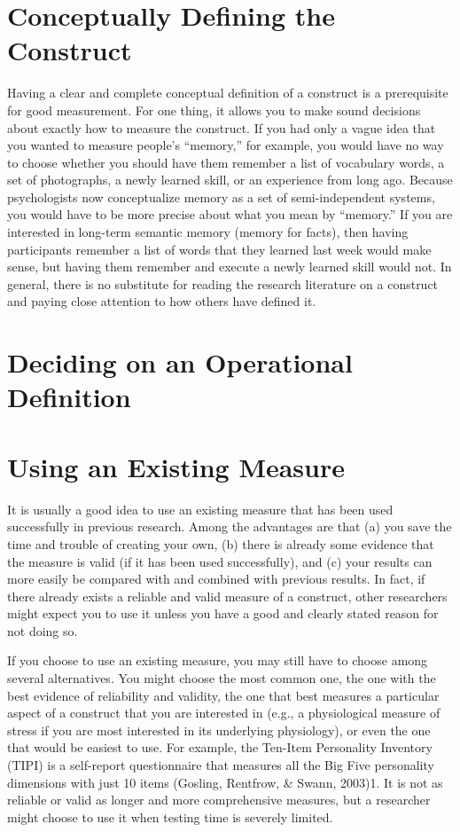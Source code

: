 \documentclass[]{book}
\theoremstyle{definition}
\theoremstyle{definition}
\theoremstyle{remark}
\begin{document}
\section{Conceptually Defining the
Construct}\label{conceptually-defining-the-construct}

Having a clear and complete conceptual definition of a construct is a
prerequisite for good measurement. For one thing, it allows you to make
sound decisions about exactly how to measure the construct. If you had
only a vague idea that you wanted to measure people's ``memory,'' for
example, you would have no way to choose whether you should have them
remember a list of vocabulary words, a set of photographs, a newly
learned skill, or an experience from long ago. Because psychologists now
conceptualize memory as a set of semi-independent systems, you would
have to be more precise about what you mean by ``memory.'' If you are
interested in long-term semantic memory (memory for facts), then having
participants remember a list of words that they learned last week would
make sense, but having them remember and execute a newly learned skill
would not. In general, there is no substitute for reading the research
literature on a construct and paying close attention to how others have
defined it.

\section{Deciding on an Operational
Definition}\label{deciding-on-an-operational-definition}

\section{Using an Existing Measure}\label{using-an-existing-measure}

It is usually a good idea to use an existing measure that has been used
successfully in previous research. Among the advantages are that (a) you
save the time and trouble of creating your own, (b) there is already
some evidence that the measure is valid (if it has been used
successfully), and (c) your results can more easily be compared with and
combined with previous results. In fact, if there already exists a
reliable and valid measure of a construct, other researchers might
expect you to use it unless you have a good and clearly stated reason
for not doing so.

If you choose to use an existing measure, you may still have to choose
among several alternatives. You might choose the most common one, the
one with the best evidence of reliability and validity, the one that
best measures a particular aspect of a construct that you are interested
in (e.g., a physiological measure of stress if you are most interested
in its underlying physiology), or even the one that would be easiest to
use. For example, the Ten-Item Personality Inventory (TIPI) is a
self-report questionnaire that measures all the Big Five personality
dimensions with just 10 items (Gosling, Rentfrow, \& Swann, 2003)1. It
is not as reliable or valid as longer and more comprehensive measures,
but a researcher might choose to use it when testing time is severely
limited.
\end{document}
